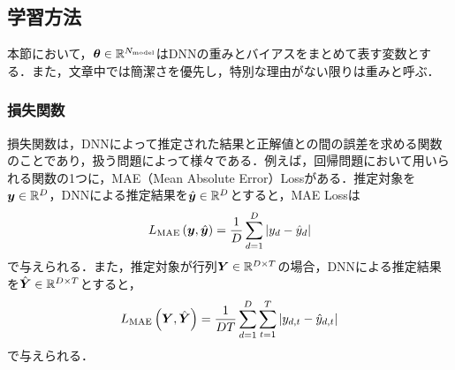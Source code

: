 \subsection{学習方法}
本節において，$\bm{\theta} \in \mathbb{R}^{N_{\text{model}}}$はDNNの重みとバイアスをまとめて表す変数とする．また，文章中では簡潔さを優先し，特別な理由がない限りは重みと呼ぶ．

\subsubsection{損失関数}
損失関数は，DNNによって推定された結果と正解値との間の誤差を求める関数のことであり，扱う問題によって様々である．例えば，回帰問題において用いられる関数の1つに，MAE（Mean Absolute Error）Lossがある．推定対象を$\bm{y} \in \mathbb{R}^{D}$，DNNによる推定結果を$\hat{\bm{y}} \in \mathbb{R}^{D}$とすると，MAE Lossは
\begin{equation}
    L_{\text{MAE}}\left(\bm{y}, \hat{\bm{y}}\right) = \frac{1}{D} \sum_{d = 1}^{D}  |y_{d} - \hat{y}_{d}|
\end{equation}
で与えられる．また，推定対象が行列$\bm{Y} \in \mathbb{R}^{D \times T}$の場合，DNNによる推定結果を$\hat{\bm{Y}} \in \mathbb{R}^{D \times T}$とすると，
\begin{equation}
    L_{\text{MAE}}\left(\bm{Y}, \hat{\bm{Y}}\right) = \frac{1}{D T} \sum_{d = 1}^{D} \sum_{t = 1}^{T}  |y_{d, t} - \hat{y}_{d, t}|
\end{equation}
で与えられる．

